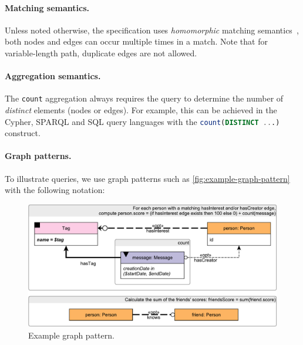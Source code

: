 \paragraph{Matching semantics.}

Unless noted otherwise, the specification uses \emph{homomorphic} matching 
semantics~\cite{DBLP:journals/csur/AnglesABHRV17}, \ie both nodes and edges can 
occur multiple times in a match. Note that for variable-length path, duplicate 
edges are not allowed.

\paragraph{Aggregation semantics.}

The \lstinline{count} aggregation always requires the query to determine the number of \emph{distinct} elements (nodes or edges). For example, this can be achieved in the Cypher, SPARQL and SQL query languages with the \lstinline[language=sql]{count(DISTINCT ...)} construct.

\paragraph{Graph patterns.}

To illustrate queries, we use graph patterns such as \autoref{fig:example-graph-pattern} with the following notation:

\begin{figure}[ht]
	\begin{center}
		\includegraphics[scale=\yedscale,margin=0cm .2cm]{patterns/bi-read-08}
		\caption{Example graph pattern.}
		\label{fig:example-graph-pattern}
	\end{center}
\end{figure}

